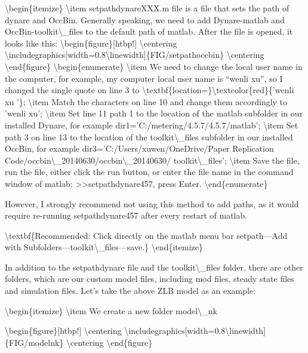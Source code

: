 \documentclass[10pt,math=newtx,citestyle=gb7714-2015,bibstyle=gb7714-2015]{elegantbook}
\begin{document}
	\textbackslash{}begin\{itemize\}
	\textbackslash{}item 
	setpathdynareXXX.m file is a file that sets the path of dynare and OccBin. Generally speaking, we need to add Dynare-matlab and OccBin-toolkit\textbackslash{}\_files to the default path of matlab. After the file is opened, it looks like this:
	\textbackslash{}begin\{figure\}[htbp!]
	\textbackslash{}centering
	\textbackslash{}includegraphics[width=0.8\textbackslash{}linewidth]\{FIG/setpathoccbin\}
	\textbackslash{}centering
	\textbackslash{}end\{figure\}
	\textbackslash{}begin\{enumerate\}
	\textbackslash{}item We need to change the local user name in the computer, for example, my computer local user name is ``wenli xu'', so I changed the single quote on line 3 to \textbackslash{}textbf\{location=\}\textbackslash{}textcolor\{red\}\{'wenli xu '\};
	\textbackslash{}item Match the characters on line 10 and change them accordingly to 'wenli xu';
	\textbackslash{}item Set line 11 path 1 to the location of the matlab subfolder in our installed Dynare, for example dir1='C:/metering/4.5.7/4.5.7/matlab';
	\textbackslash{}item Set path 3 on line 13 to the location of the toolkit\textbackslash{}\_files subfolder in our installed OccBin, for example dir3='C:/Users/xuwen/OneDrive/Paper Replication Code/occbin\textbackslash{}\_20140630/occbin\textbackslash{}\_20140630/ toolkit\textbackslash{}\_files';
	\textbackslash{}item Save the file, run the file, either click the run button, or enter the file name in the command window of matlab: >>setpathdynare457, press Enter.
	\textbackslash{}end\{enumerate\}
	
	However, I strongly recommend not using this method to add paths, as it would require re-running setpathdynare457 after every restart of matlab.
	
	\textbackslash{}textbf\{Recommended: Click directly on the matlab menu bar setpath---Add with Subfolders---toolkit\textbackslash{}\_files---save.\}
	\textbackslash{}end\{itemize\}
	
	In addition to the setpathdynare file and the toolkit\textbackslash{}\_files folder, there are other folders, which are our custom model files, including mod files, steady state files and simulation files. Let's take the above ZLB model as an example:
	
	\textbackslash{}begin\{itemize\}
	\textbackslash{}item We create a new folder model\textbackslash{}\_nk
	
	\textbackslash{}begin\{figure\}[htbp!]
	\textbackslash{}centering
	\textbackslash{}includegraphics[width=0.8\textbackslash{}linewidth]\{FIG/modelnk\}
	\textbackslash{}centering
	\textbackslash{}end\{figure\}
	
\end{document}

